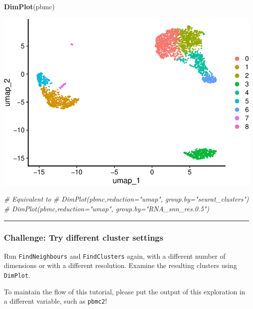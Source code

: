\documentclass[
]{book}
\newenvironment{Shaded}{\begin{snugshade}}{\end{snugshade}}
\newcommand{\CommentTok}[1]{\textcolor[rgb]{0.56,0.35,0.01}{\textit{#1}}}
\newcommand{\FunctionTok}[1]{\textcolor[rgb]{0.13,0.29,0.53}{\textbf{#1}}}
\newcommand{\NormalTok}[1]{#1}
\begin{document}
\begin{Shaded}
\begin{Highlighting}[]
\FunctionTok{DimPlot}\NormalTok{(pbmc)}
\end{Highlighting}
\end{Shaded}

\includegraphics{scRNAseqInR_Doco_files/figure-latex/unnamed-chunk-23-1.pdf}

\begin{Shaded}
\begin{Highlighting}[]
\CommentTok{\# Equivalent to}
\CommentTok{\# DimPlot(pbmc,reduction="umap", group.by="seurat\_clusters")}
\CommentTok{\# DimPlot(pbmc,reduction="umap", group.by="RNA\_snn\_res.0.5")}
\end{Highlighting}
\end{Shaded}

\begin{center}\rule{0.5\linewidth}{0.5pt}\end{center}

\hypertarget{challenge-try-different-cluster-settings}{%
\subsubsection*{Challenge: Try different cluster settings}\label{challenge-try-different-cluster-settings}}

Run \texttt{FindNeighbours} and \texttt{FindClusters} again, with a different number of dimensions or with a different resolution. Examine the resulting clusters using \texttt{DimPlot}.

To maintain the flow of this tutorial, please put the output of this exploration in a different variable, such as \texttt{pbmc2}!
\end{document}
